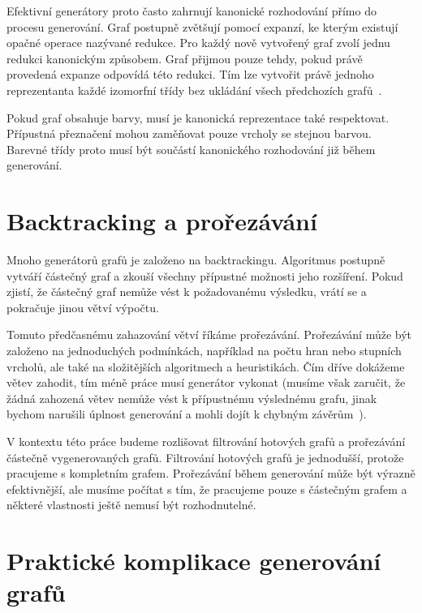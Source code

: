 Efektivní generátory proto často zahrnují kanonické rozhodování přímo do
procesu generování. Graf postupně zvětšují pomocí expanzí, ke kterým existují 
opačné operace nazývané redukce. Pro každý nově vytvořený graf zvolí jednu redukci 
kanonickým způsobem. Graf přijmou pouze tehdy, pokud právě provedená expanze odpovídá 
této redukci. Tím lze
vytvořit právě jednoho reprezentanta každé izomorfní třídy bez ukládání všech
předchozích grafů~\cite[Section~2.2.1]{jooken2025computerassisted}.

Pokud graf obsahuje barvy, musí je kanonická
reprezentace také respektovat. Přípustná přeznačení mohou zaměňovat pouze
vrcholy se stejnou barvou. Barevné třídy proto musí být součástí kanonického
rozhodování již během generování.


\section{Backtracking a prořezávání}
\label{sec:backtracking-pruning}

Mnoho generátorů grafů je založeno na backtrackingu. Algoritmus postupně vytváří
částečný graf a zkouší všechny přípustné možnosti jeho rozšíření. Pokud zjistí,
že částečný graf nemůže vést k požadovanému výsledku, vrátí se a pokračuje jinou
větví výpočtu.

Tomuto předčasnému zahazování větví říkáme prořezávání. Prořezávání může být založeno na
jednoduchých podmínkách, například na počtu hran nebo stupních vrcholů, ale také na složitějších
algoritmech a heuristikách. Čím dříve dokážeme větev zahodit, tím méně práce musí generátor vykonat (musíme však zaručit, 
že žádná zahozená větev nemůže vést k přípustnému výslednému grafu, jinak bychom narušili 
úplnost generování a mohli dojít k chybným 
závěrům~\cite[Sections~2.2 and~2.3.2]{jooken2025computerassisted}).

V kontextu této práce budeme rozlišovat filtrování hotových grafů a prořezávání částečně
vygenerovaných grafů. Filtrování hotových grafů je jednodušší, protože pracujeme s kompletním
grafem. Prořezávání během generování může být výrazně efektivnější, ale musíme počítat s tím,
že pracujeme pouze s částečným grafem a některé vlastnosti ještě nemusí být rozhodnutelné.

\section{Praktické komplikace generování grafů}
\label{sec:practical-complications}

